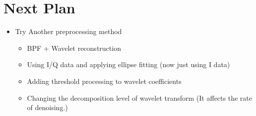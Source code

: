 \documentclass[dvipdfmx]{article}
\begin{document}
\section{Next Plan}
\begin{itemize}
    \item Try Another preprocessing method
    \begin{itemize}
        \item BPF + Wavelet reconstruction
        \item Using I/Q data and applying ellipse fitting (now just using I data)
        \item Adding threshold processing to wavelet coefficients
        \item Changing the decomposition level of wavelet transform (It affects the rate of denoising.)
    \end{itemize}
\end{itemize}
\end{document}
